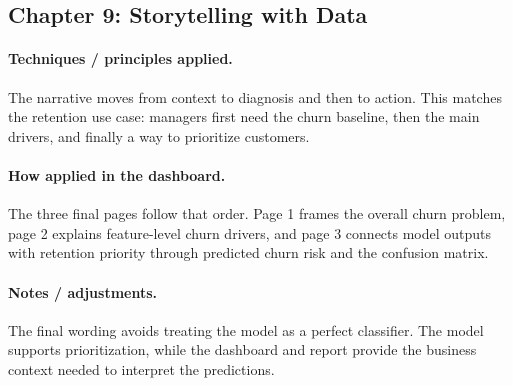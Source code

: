 \subsection{Chapter 9: Storytelling with Data}
\paragraph{Techniques / principles applied.}
The narrative moves from context to diagnosis and then to action. This matches
the retention use case: managers first need the churn baseline, then the main
drivers, and finally a way to prioritize customers.

\paragraph{How applied in the dashboard.}
The three final pages follow that order. Page 1 frames the overall churn
problem, page 2 explains feature-level churn drivers, and page 3 connects model
outputs with retention priority through predicted churn risk and the confusion
matrix.

\paragraph{Notes / adjustments.}
The final wording avoids treating the model as a perfect classifier. The model
supports prioritization, while the dashboard and report provide the business
context needed to interpret the predictions.

